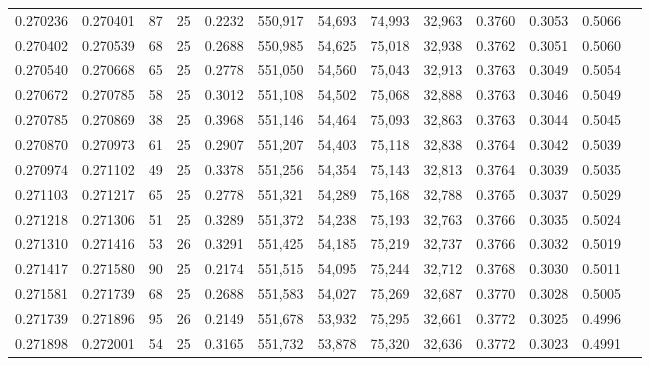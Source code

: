 \begin{tabular}{rrrrrrrrrrrrr}
0.270236 & 0.270401 &    87 &  25 &                                     0.2232 & 550,917 &  54,693 &  74,993 &  32,963 & 0.3760 & 0.3053 & 0.5066 \\
0.270402 & 0.270539 &    68 &  25 &                                     0.2688 & 550,985 &  54,625 &  75,018 &  32,938 & 0.3762 & 0.3051 & 0.5060 \\
0.270540 & 0.270668 &    65 &  25 &                                     0.2778 & 551,050 &  54,560 &  75,043 &  32,913 & 0.3763 & 0.3049 & 0.5054 \\
0.270672 & 0.270785 &    58 &  25 &                                     0.3012 & 551,108 &  54,502 &  75,068 &  32,888 & 0.3763 & 0.3046 & 0.5049 \\
0.270785 & 0.270869 &    38 &  25 &                                     0.3968 & 551,146 &  54,464 &  75,093 &  32,863 & 0.3763 & 0.3044 & 0.5045 \\
0.270870 & 0.270973 &    61 &  25 &                                     0.2907 & 551,207 &  54,403 &  75,118 &  32,838 & 0.3764 & 0.3042 & 0.5039 \\
0.270974 & 0.271102 &    49 &  25 &                                     0.3378 & 551,256 &  54,354 &  75,143 &  32,813 & 0.3764 & 0.3039 & 0.5035 \\
0.271103 & 0.271217 &    65 &  25 &                                     0.2778 & 551,321 &  54,289 &  75,168 &  32,788 & 0.3765 & 0.3037 & 0.5029 \\
0.271218 & 0.271306 &    51 &  25 &                                     0.3289 & 551,372 &  54,238 &  75,193 &  32,763 & 0.3766 & 0.3035 & 0.5024 \\
0.271310 & 0.271416 &    53 &  26 &                                     0.3291 & 551,425 &  54,185 &  75,219 &  32,737 & 0.3766 & 0.3032 & 0.5019 \\
0.271417 & 0.271580 &    90 &  25 &                                     0.2174 & 551,515 &  54,095 &  75,244 &  32,712 & 0.3768 & 0.3030 & 0.5011 \\
0.271581 & 0.271739 &    68 &  25 &                                     0.2688 & 551,583 &  54,027 &  75,269 &  32,687 & 0.3770 & 0.3028 & 0.5005 \\
0.271739 & 0.271896 &    95 &  26 &                                     0.2149 & 551,678 &  53,932 &  75,295 &  32,661 & 0.3772 & 0.3025 & 0.4996 \\
0.271898 & 0.272001 &    54 &  25 &                                     0.3165 & 551,732 &  53,878 &  75,320 &  32,636 & 0.3772 & 0.3023 & 0.4991 \\

\end{tabular}
